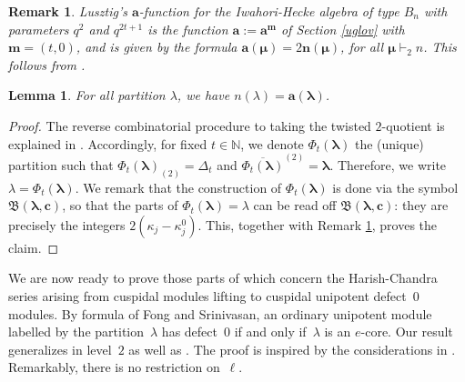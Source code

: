\documentclass[twoside,12pt]{amsart}
\theoremstyle{plain}
\newtheorem{lem}[num]{Lemma}
\newtheorem{rem}[num]{Remark}
\begin{document}
\begin{rem}\label{remafunction}
Lusztig's ${\mathbf{a}}$-function for the Iwahori-Hecke algebra of type $B_n$
with parameters $q^2$ and $q^{2t+1}$ is the function ${\mathbf{a}}:={\mathbf{a}}^{\mathbf{m}}$ of 
Section \ref{uglov} with ${\mathbf{m}}=(t,0)$, and is given by the formula 
${\mathbf{a}}({\boldsymbol{\mu}}) = 2 {\mathbf{n}}({\boldsymbol{\mu}})$, for all ${\boldsymbol{\mu}}\vdash_2 n$. This follows from 
\cite[Proposition 5.5.11, Example 5.5.14 and Example 1.3.9]{GeckJacon2011}.
\end{rem}

\begin{lem}\label{lemafunction}
For all partition ${\lambda}$, we have $n({\lambda}) = {\mathbf{a}}({\boldsymbol{\lambda}})$.
\end{lem}

\begin{proof}
The reverse combinatorial procedure to taking the twisted $2$-quotient is
explained in \cite[Section 7.2]{GerberHissJacon2014}. Accordingly, for fixed 
$t\in{\mathbb{N}}$, we denote $\Phi_t({\boldsymbol{\lambda}})$ the (unique) partition such that 
$\Phi_t({\boldsymbol{\lambda}})_{(2)}={\Delta}_t$ and $\overline{\Phi_t({\boldsymbol{\lambda}})}^{(2)}={\boldsymbol{\lambda}}$.
Therefore, we write ${\lambda}=\Phi_t({\boldsymbol{\lambda}})$. We remark that the construction of 
$\Phi_t({\boldsymbol{\lambda}})$ is done via the symbol ${\mathfrak{B}}({\boldsymbol{\lambda}},{\mathbf{c}})$, so that the parts of 
$\Phi_t({\boldsymbol{\lambda}})={\lambda}$ can be read off ${\mathfrak{B}}({\boldsymbol{\lambda}},{\mathbf{c}})$: they are precisely the 
integers $2({\kappa}_j - {\kappa}_j^0)$. This, together with Remark \ref{remafunction}, 
proves the claim.
\end{proof}

We are now ready to prove 
those parts of \cite[Conjecture~5.7]{GerberHissJacon2014}
which concern the Harish-Chandra series arising from cuspidal modules lifting
to cuspidal unipotent defect~$0$ modules. By formula \cite[(8.5)]{FongSrinivasan1982} 
of Fong and Srinivasan, an ordinary unipotent module labelled by the
partition~$\lambda$ has defect~$0$ if and only if~$\lambda$ is an $e$-core.
Our result generalizes \cite[Theorem~$5.4$]{GeckJacon2006} in level~$2$ as well as
\cite[Theorem~6.2]{GerberHissJacon2014}. The proof is inspired by the considerations 
in \cite[2.5]{Geck2006}. Remarkably, there is no restriction on~$\ell$.
\end{document}

